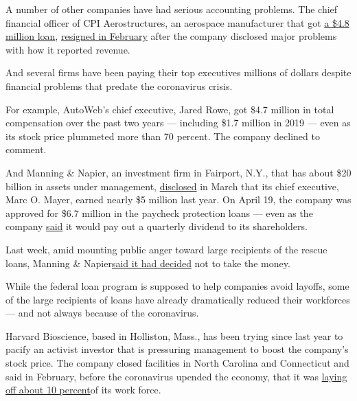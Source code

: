 A number of other companies have had serious accounting problems. The
chief financial officer of CPI Aerostructures, an aerospace manufacturer
that got
\href{http://www.cpiaero.com/cpi-aero-secures-\%244.8m-loan.html}{a
\$4.8 million loan},
\href{https://www.newsday.com/business/cpi-aerostructures-financial-reports-1.41833254}{resigned
in February} after the company disclosed major problems with how it
reported revenue.

And several firms have been paying their top executives millions of
dollars despite financial problems that predate the coronavirus crisis.

For example, AutoWeb's chief executive, Jared Rowe, got \$4.7 million in
total compensation over the past two years --- including \$1.7 million
in 2019 --- even as its stock price plummeted more than 70 percent. The
company declined to comment.

And Manning \& Napier, an investment firm in Fairport, N.Y., that has
about \$20 billion in assets under management,
\href{https://www.sec.gov/Archives/edgar/data/1524223/000152422320000015/mn201910-k_12312019.htm}{disclosed}
in March that its chief executive, Marc O. Mayer, earned nearly \$5
million last year. On April 19, the company was approved for \$6.7
million in the paycheck protection loans --- even as the company
\href{https://productionmn.blob.core.windows.net/media/Default/newsroom/2020/Manning\%20\%20Napier,\%20Inc.\%20Provides\%20Updates.pdf}{said}
it would pay out a quarterly dividend to its shareholders.

Last week, amid mounting public anger toward large recipients of the
rescue loans, Manning \&
Napier\href{https://www.sec.gov/Archives/edgar/data/1524223/000119312520118108/d885193dex991.htm}{said
it had decided} not to take the money.

While the federal loan program is supposed to help companies avoid
layoffs, some of the large recipients of loans have already dramatically
reduced their workforces --- and not always because of the coronavirus.

Harvard Bioscience, based in Holliston, Mass., has been trying since
last year to pacify an activist investor that is pressuring management
to boost the company's stock price. The company closed facilities in
North Carolina and Connecticut and said in February, before the
coronavirus upended the economy, that it was
\href{https://finance.yahoo.com/news/harvard-bioscience-announces-fourth-quarter-121510013.html}{laying
off about 10 percent}of its work force.

